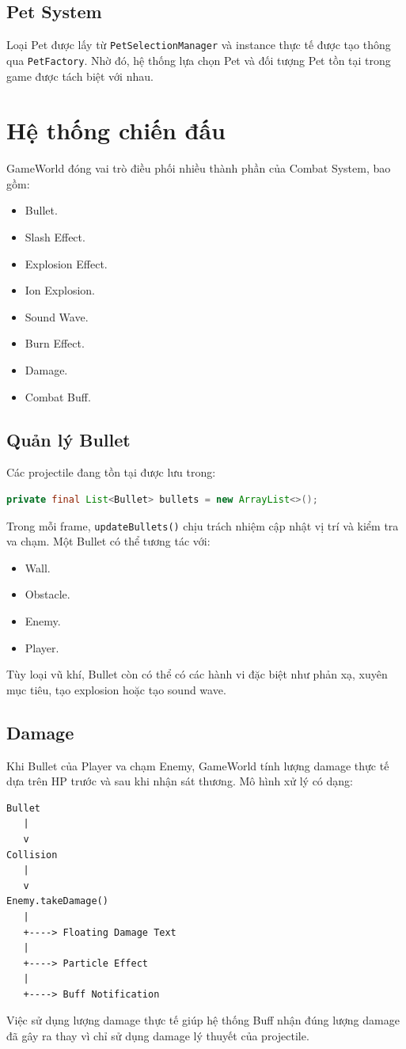\documentclass[12pt,a4paper]{report}
\begin{document}
    \subsection{Pet System}
    Loại Pet được lấy từ \texttt{PetSelectionManager} và instance
    thực tế được tạo thông qua \texttt{PetFactory}.
    Nhờ đó, hệ thống lựa chọn Pet và đối tượng Pet tồn tại trong
    game được tách biệt với nhau.


    \section{Hệ thống chiến đấu}
    GameWorld đóng vai trò điều phối nhiều thành phần của Combat
    System, bao gồm:
    \begin{itemize}
        \item Bullet.
        \item Slash Effect.
        \item Explosion Effect.
        \item Ion Explosion.
        \item Sound Wave.
        \item Burn Effect.
        \item Damage.
        \item Combat Buff.
    \end{itemize}

    \subsection{Quản lý Bullet}
    Các projectile đang tồn tại được lưu trong:
    \begin{lstlisting}[language=Java]
private final List<Bullet> bullets = new ArrayList<>();
    \end{lstlisting}
    Trong mỗi frame, \texttt{updateBullets()} chịu trách nhiệm cập
    nhật vị trí và kiểm tra va chạm.
    Một Bullet có thể tương tác với:
    \begin{itemize}
        \item Wall.
        \item Obstacle.
        \item Enemy.
        \item Player.
    \end{itemize}
    Tùy loại vũ khí, Bullet còn có thể có các hành vi đặc biệt như
    phản xạ, xuyên mục tiêu, tạo explosion hoặc tạo sound wave.

    \subsection{Damage}
    Khi Bullet của Player va chạm Enemy, GameWorld tính lượng damage
    thực tế dựa trên HP trước và sau khi nhận sát thương.
    Mô hình xử lý có dạng:
    \begin{verbatim}
Bullet
   |
   v
Collision
   |
   v
Enemy.takeDamage()
   |
   +----> Floating Damage Text
   |
   +----> Particle Effect
   |
   +----> Buff Notification
    \end{verbatim}
    Việc sử dụng lượng damage thực tế giúp hệ thống Buff nhận đúng
    lượng damage đã gây ra thay vì chỉ sử dụng damage lý thuyết
    của projectile.
\end{document}
